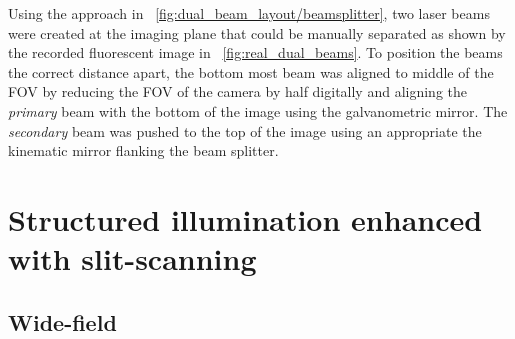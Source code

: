Using the approach in \figurename~\ref{fig:dual_beam_layout/beamsplitter}, two laser beams were created at the imaging plane that could be manually separated as shown by the recorded fluorescent image in \figurename~\ref{fig:real_dual_beams}.
To position the beams the correct distance apart, the bottom most beam was aligned to middle of the \gls{FOV} by reducing the \gls{FOV} of the camera by half digitally and aligning the \emph{primary} beam with the bottom of the image using the galvanometric mirror.
The \emph{secondary} beam was pushed to the top of the image using an appropriate the kinematic mirror flanking the beam splitter.
%  
%  
\section{Structured illumination enhanced with slit-scan\-ning}

\subsection{Wide-field}

